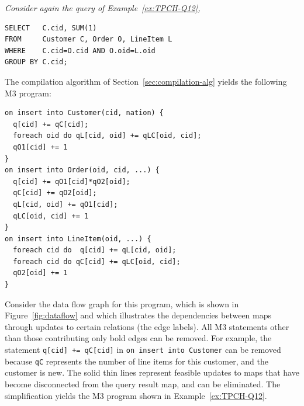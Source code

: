 \begin{example}\em
Consider again the query of Example~\ref{ex:TPCH-Q12},
\begin{verbatim}
SELECT   C.cid, SUM(1)
FROM     Customer C, Order O, LineItem L
WHERE    C.cid=O.cid AND O.oid=L.oid
GROUP BY C.cid;
\end{verbatim}

The compilation algorithm of Section~\ref{sec:compilation-alg} yields the
following M3 program:
\begin{verbatim}
on insert into Customer(cid, nation) {
  q[cid] += qC[cid];
  foreach oid do qL[cid, oid] += qLC[oid, cid];
  qO1[cid] += 1
}
on insert into Order(oid, cid, ...) {
  q[cid] += qO1[cid]*qO2[oid];
  qC[cid] += qO2[oid];
  qL[cid, oid] += qO1[cid];
  qLC[oid, cid] += 1
}
on insert into LineItem(oid, ...) {
  foreach cid do  q[cid] += qL[cid, oid];
  foreach cid do qC[cid] += qLC[oid, cid];
  qO2[oid] += 1
}
\end{verbatim}

Consider the data flow graph for this program, which is shown in
Figure~\ref{fig:dataflow} and which illustrates the dependencies between
maps through updates to certain relations (the edge labels). All M3 statements
other than those contributing only bold edges can be removed. For example,
the statement {\tt q[cid] += qC[cid]} in {\tt on insert into Customer}
can be removed because {\tt qC} represents the number of line items for this
customer, and the customer is new. The solid thin lines represent
feasible updates to maps that have become disconnected from the query result
map, and can be eliminated.
The simplification yields the M3 program shown in Example~\ref{ex:TPCH-Q12}.
\punto
\end{example}


